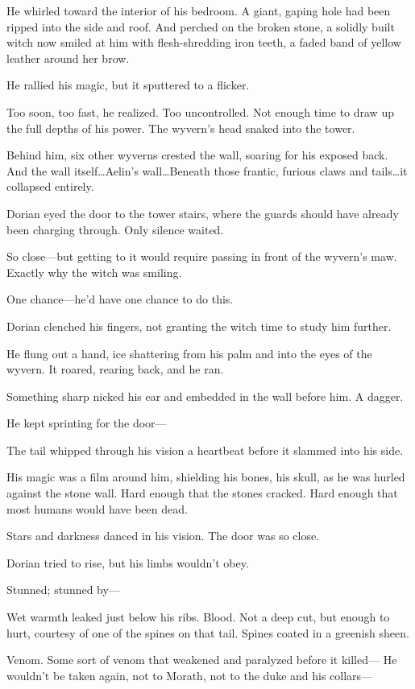 He whirled toward the interior of his bedroom.
A giant, gaping hole had been ripped into the side and roof.
And perched on the broken stone, a solidly built witch now smiled at him with flesh-shredding iron teeth, a faded band of yellow leather around her brow.

He rallied his magic, but it sputtered to a flicker.

Too soon, too fast, he realized.
Too uncontrolled.
Not enough time to draw up the full depths of his power.
The wyvern's head snaked into the tower.

Behind him, six other wyverns crested the wall, soaring for his exposed back.
And the wall itself\ldots Aelin's wall\ldots Beneath those frantic, furious claws and tails\ldots it collapsed entirely.

Dorian eyed the door to the tower stairs, where the guards should have already been charging through.
Only silence waited.

So close---but getting to it would require passing in front of the wyvern's maw.
Exactly why the witch was smiling.

One chance---he'd have one chance to do this.

Dorian clenched his fingers, not granting the witch time to study him further.

He flung out a hand, ice shattering from his palm and into the eyes of the wyvern.
It roared, rearing back, and he ran.

Something sharp nicked his ear and embedded in the wall before him.
A dagger.

He kept sprinting for the door---

The tail whipped through his vision a heartbeat before it slammed into his side.

His magic was a film around him, shielding his bones, his skull, as he was hurled against the stone wall.
Hard enough that the stones cracked.
Hard enough that most humans would have been dead.

Stars and darkness danced in his vision.
The door was so close.

Dorian tried to rise, but his limbs wouldn't obey.

Stunned; stunned by---

Wet warmth leaked just below his ribs.
Blood.
Not a deep cut, but enough to hurt, courtesy of one of the spines on that tail.
Spines coated in a greenish sheen.

Venom.
Some sort of venom that weakened and paralyzed before it killed--- He wouldn't be taken again, not to Morath, not to the duke and his collars---

